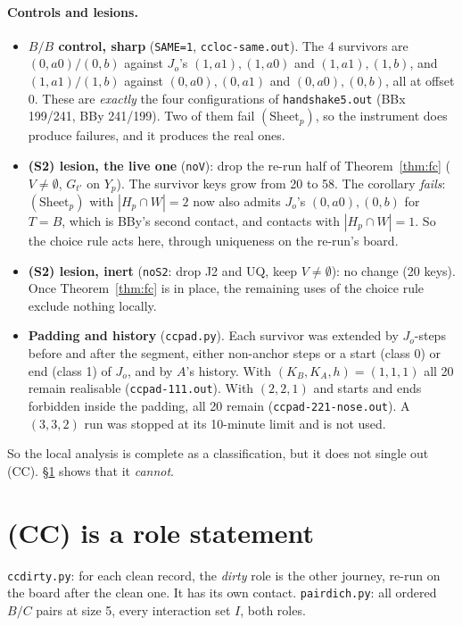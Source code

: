 \documentclass[11pt]{article}
\theoremstyle{definition}\newtheorem{definition}[theorem]{Definition}\newtheorem{remark}[theorem]{Remark}
\begin{document}
\paragraph{Controls and lesions.}
\begin{itemize}
\item \textbf{$B/B$ control, sharp} (\texttt{SAME=1}, \texttt{ccloc-same.out}). The 4 survivors are $(0,a0)/(0,b)$ against $J_o$'s $(1,a1),(1,a0)$ and $(1,a1),(1,b)$, and $(1,a1)/(1,b)$ against $(0,a0),(0,a1)$ and $(0,a0),(0,b)$, all at offset $0$. These are \emph{exactly} the four configurations of \texttt{handshake5.out} (BBx 199/241, BBy 241/199). Two of them fail $(\mathrm{Sheet}_p)$, so the instrument does produce failures, and it produces the real ones.
\item \textbf{(S2) lesion, the live one} (\texttt{noV}): drop the re-run half of Theorem~\ref{thm:fc} ($V\ne\emptyset$, $G_{t'}$ on $Y_p$). The survivor keys grow from 20 to 58. The corollary \emph{fails}: $(\mathrm{Sheet}_p)$ with $|H_p\cap W|=2$ now also admits $J_o$'s $(0,a0),(0,b)$ for $T=B$, which is BBy's second contact, and contacts with $|H_p\cap W|=1$. So the choice rule acts here, through uniqueness on the re-run's board.
\item \textbf{(S2) lesion, inert} (\texttt{noS2}: drop J2 and UQ, keep $V\ne\emptyset$): no change (20 keys). Once Theorem~\ref{thm:fc} is in place, the remaining uses of the choice rule exclude nothing locally.
\item \textbf{Padding and history} (\texttt{ccpad.py}). Each survivor was extended by $J_o$-steps before and after the segment, either non-anchor steps or a start (class 0) or end (class 1) of $J_o$, and by $A$'s history. With $(K_B,K_A,h)=(1,1,1)$ all 20 remain realisable (\texttt{ccpad-111.out}). With $(2,2,1)$ and starts and ends forbidden inside the padding, all 20 remain (\texttt{ccpad-221-nose.out}). A $(3,3,2)$ run was stopped at its 10-minute limit and is not used.
\end{itemize}
\noindent So the local analysis is complete as a classification, but it does not single out (CC). \S\ref{sec:role} shows that it \emph{cannot}.

\section{(CC) is a role statement}\label{sec:role}
\texttt{ccdirty.py}: for each clean record, the \emph{dirty} role is the other journey, re-run on the board after the clean one. It has its own contact. \texttt{pairdich.py}: all ordered $B/C$ pairs at size 5, every interaction set $I$, both roles.
\end{document}
